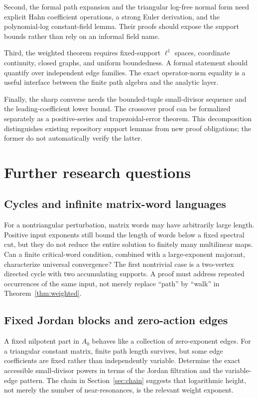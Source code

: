 \documentclass[11pt,a4paper]{article}
\numberwithin{equation}{section}
\theoremstyle{definition}
\theoremstyle{remark}
\begin{document}
Second, the formal path expansion and the triangular log-free normal form
need explicit Hahn coefficient operations, a strong Euler derivation, and
the polynomial-log constant-field lemma. Their proofs should expose the
support bounds rather than rely on an informal field name.

Third, the weighted theorem requires fixed-support $\ell^1$ spaces,
coordinate continuity, closed graphs, and uniform boundedness. A formal
statement should quantify over independent edge families. The exact
operator-norm equality is a useful interface between the finite path
algebra and the analytic layer.

Finally, the sharp converse needs the bounded-tuple small-divisor sequence
and the leading-coefficient lower bound. The crossover proof can be
formalized separately as a positive-series and trapezoidal-error theorem.
This decomposition distinguishes existing repository support lemmas from
new proof obligations; the former do not automatically verify the latter.

\section{Further research questions}
\label{sec:future}

\subsection{Cycles and infinite matrix-word languages}
For a nontriangular perturbation, matrix words may have arbitrarily large
length. Positive input exponents still bound the length of words below a
fixed spectral cut, but they do not reduce the entire solution to finitely
many multilinear maps. Can a finite critical-word condition, combined with
a large-exponent majorant, characterize universal convergence? The first
nontrivial case is a two-vertex directed cycle with two accumulating
supports. A proof must address repeated occurrences of the same input,
not merely replace ``path'' by ``walk'' in Theorem~\ref{thm:weighted}.

\subsection{Fixed Jordan blocks and zero-action edges}
A fixed nilpotent part in $A_0$ behaves like a collection of zero-exponent
edges. For a triangular constant matrix, finite path length survives, but
some edge coefficients are fixed rather than independently variable.
Determine the exact accessible small-divisor powers in terms of the
Jordan filtration and the variable-edge pattern. The chain in
Section~\ref{sec:chain} suggests that logarithmic height, not merely the
number of near-resonances, is the relevant weight exponent.
\end{document}
